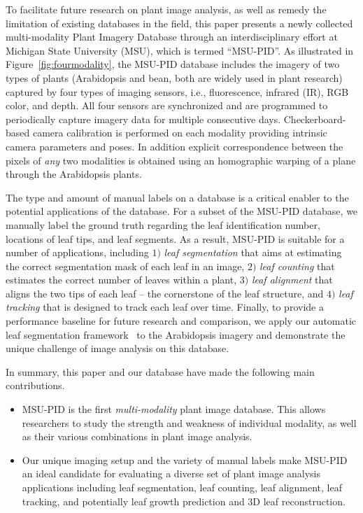 To facilitate future research on plant image analysis, as well as remedy the limitation of existing databases in the field, this paper presents a newly collected multi-modality Plant Imagery Database through an interdisciplinary effort at Michigan State University (MSU), which is termed ``MSU-PID''.
As illustrated in Figure~\ref{fig:fourmodality}, the MSU-PID database includes the imagery of two types of plants (Arabidopsis and bean, both are widely used in plant research) captured by four types of imaging sensors, i.e., fluorescence, infrared (IR), RGB color, and depth.
All four sensors are synchronized and are programmed to periodically capture imagery data for multiple consecutive days.
Checkerboard-based camera calibration is performed on each modality providing intrinsic camera parameters and poses.  In addition explicit correspondence between the pixels of {\it any} two modalities is obtained using an homographic warping of a plane through the Arabidopsis plants.


The type and amount of manual labels on a database is a critical enabler to the potential applications of the database.
For a subset of the MSU-PID database, we manually label the ground truth regarding the leaf identification number, locations of leaf tips, and leaf segments.
As a result, MSU-PID is suitable for a number of applications, including $1)$ {\it leaf segmentation} that aims at estimating the correct segmentation mask of each leaf in an image, $2)$ {\it leaf counting} that estimates the correct number of leaves within a plant, $3)$ {\it leaf alignment} that aligns the two tips of each leaf -- the cornerstone of the leaf structure, and $4)$ {\it leaf tracking} that is designed to track each leaf over time.
Finally, to provide a performance baseline for future research and comparison, we apply our automatic leaf segmentation framework~\cite{yin2014a,yin2014b} to the Arabidopsis imagery and demonstrate the unique challenge of image analysis on this database.

In summary, this paper and our database have made the following main contributions.
\begin{itemize}
\item MSU-PID is the first {\it multi-modality} plant image database. This allows researchers to study the strength and weakness of individual modality, as well as their various combinations in plant image analysis.
\item Our unique imaging setup and the variety of manual labels make MSU-PID an ideal candidate for evaluating a diverse set of plant image analysis applications including leaf segmentation, leaf counting, leaf alignment, leaf tracking, and potentially leaf growth prediction and $3$D leaf reconstruction.
\end{itemize}


